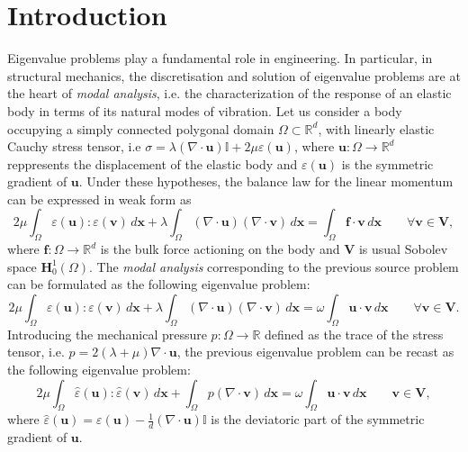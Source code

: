 \documentclass[USenglish]{article}
\theoremstyle{dgthm}
\theoremstyle{dgdef}
\let\vec\bm
\begin{document}
\section{Introduction}
Eigenvalue problems play a fundamental role in engineering. In particular, in structural mechanics, the discretisation and solution of eigenvalue problems are at the heart of \textit{modal analysis}, i.e. the characterization of the response of an elastic body in terms of its natural modes of vibration.
Let us consider a body occupying a simply connected polygonal domain $\Omega\subset \mathbb{R}^d$, with linearly elastic Cauchy stress tensor, i.e $\sigma = \lambda (\nabla\cdot \vec{u})\mathbb{I}+2\mu\varepsilon(\vec{u})$, where $\vec{u}:\Omega\to \mathbb{R}^d$ reppresents the displacement of the elastic body and $\varepsilon(\vec{u})$ is the symmetric gradient of $\vec{u}$.
Under these hypotheses, the balance law for the linear momentum can be expressed in weak form as 
\begin{equation}
  \label{eq:elasticityPrimalSource}
  2\mu \int_{\Omega} \varepsilon(\vec{u}):\varepsilon(\vec{v})\, d\vec{x} + \lambda \int_{\Omega} (\nabla \cdot \vec{u})(\nabla\cdot \vec{v})\, d\vec{x} = \int_{\Omega}\vec{f}\cdot \vec{v} \,d\vec{x} \qquad \forall \vec{v}\in \vec{V},
\end{equation}
where $\vec{f}:\Omega\to \mathbb{R}^d$ is the bulk force actioning on the body and $\vec{V}$ is usual Sobolev space $\vec{H}^1_0(\Omega)$. The \textit{modal analysis} corresponding to the previous source problem can be formulated as the following eigenvalue problem:
\begin{equation}
  \label{eq:elasticityPrimalEig}
  2\mu \int_{\Omega} \varepsilon(\vec{u}):\varepsilon(\vec{v})\, d\vec{x} + \lambda \int_{\Omega} (\nabla \cdot \vec{u})(\nabla\cdot \vec{v})\, d\vec{x} = \omega \int_{\Omega}\vec{u}\cdot \vec{v} \,d\vec{x} \qquad \forall \vec{v} \in \vec{V}.
\end{equation}
Introducing the mechanical pressure $p:\Omega\to \mathbb{R}$ defined as the trace of the stress tensor, i.e. $p = 2(\lambda+\mu) \nabla\cdot \vec{u}$, the previous eigenvalue problem can be recast as the following eigenvalue problem:
\begin{equation}
  \label{eq:elasticityPressureEig}
    2\mu \int_\Omega \widehat\varepsilon(\vec{u}):\widehat \varepsilon(\vec{v})\, d\vec{x}+\int_\Omega p (\nabla \cdot \vec{v})\, d\vec{x} = \omega \int_\Omega \vec{u}\cdot \vec{v}\, d\vec{x} \qquad \vec{v}\in \vec{V},
\end{equation}
where $\widehat\varepsilon(\vec{u}) = \varepsilon(\vec{u})-\frac{1}{d}(\nabla\cdot \vec{u})\mathbb{I}$ is the deviatoric part of the symmetric gradient of $\vec{u}$.
\end{document}
